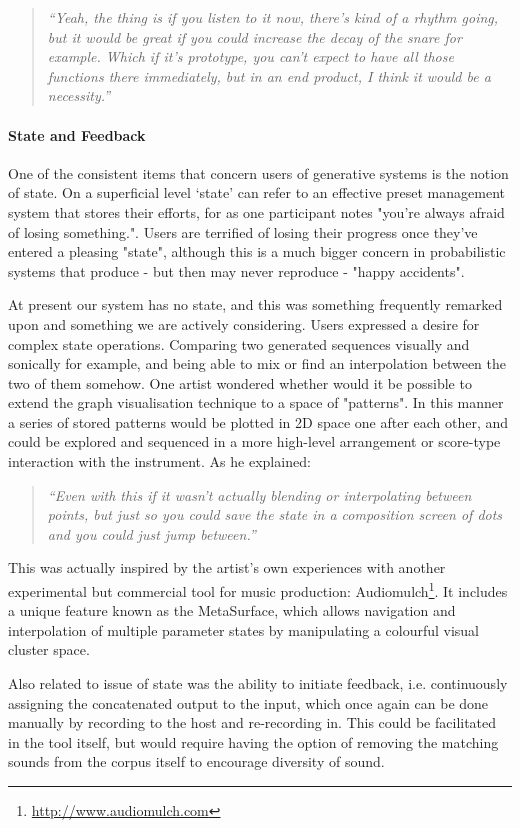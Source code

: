 \blockquote{\textit{“Yeah, the thing is if you listen to it now, there's kind of a rhythm going, but it would be great if you could increase the decay of the snare for example. Which if it's prototype, you can't expect to have all those functions there immediately, but in an end product, I think it would be a necessity.”}}

\paragraph{State and Feedback}

One of the consistent items that concern users of generative systems is the notion of state. On a superficial level `state' can refer to an effective preset management system that stores their efforts, for as one participant notes "you're always afraid of losing something.". Users are terrified of losing their progress once they've entered a pleasing "state", although this is a much bigger concern in probabilistic systems that produce - but then may never reproduce - "happy accidents".

At present our system has no state, and this was something frequently remarked upon and something we are actively considering. Users expressed a desire for complex state operations. Comparing two generated sequences visually and sonically for example, and being able to mix or find an interpolation between the two of them somehow. One artist wondered whether would it be possible to extend the graph visualisation technique to a space of "patterns". In this manner a series of stored patterns would be plotted in 2D space one after each other, and could be explored and sequenced in a more high-level arrangement or score-type interaction with the instrument. As he explained:

\blockquote{\textit{“Even with this if it wasn't actually blending or interpolating between points, but just so you could save the state in a composition screen of dots and you could just jump between.”}}

This was actually inspired by the artist's own experiences with another experimental but commercial tool for music production: Audiomulch\footnote{\url{http://www.audiomulch.com}}. It includes a unique feature known as the MetaSurface, which allows navigation and interpolation of multiple parameter states by manipulating a colourful visual cluster space.

Also related to issue of state was the ability to initiate feedback, i.e. continuously assigning the concatenated output to the input, which once again can be done manually by recording to the host and re-recording in. This could be facilitated in the tool itself, but would require having the option of removing the matching sounds from the corpus itself to encourage diversity of sound.

